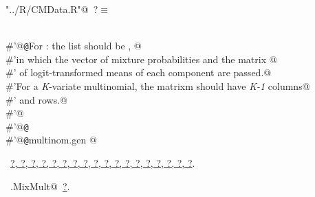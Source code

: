 \documentclass[reqno]{amsart}
\renewcommand{\NWtarget}[2]{\hypertarget{#1}{#2}}
\renewcommand{\NWlink}[2]{\hyperlink{#1}{#2}}
\begin{document}
\begin{flushleft} \small\label{scrap17}\raggedright\small
\NWtarget{nuweb?}{} \verb@"../R/CMData.R"@\nobreak\ {\footnotesize {?}}$\equiv$
\vspace{-1ex}
\begin{list}{}{} \item
\mbox{}\verb@@\\
\mbox{}\verb@#'@{\tt @}\verb@details For : the  list should be , @\\
\mbox{}\verb@#'in which the vector of mixture probabilities  and the matrix @\\
\mbox{}\verb@#' of logit-transformed means of each component are passed.@\\
\mbox{}\verb@#'For a \emph{K}-variate multinomial, the matrix{m} should have \emph{K-1} columns@\\
\mbox{}\verb@#' and  rows.@\\
\mbox{}\verb@#'@\\
\mbox{}\verb@#'@{\tt @}\verb@export@\\
\mbox{}\verb@#'@{\tt @}\verb@rdname multinom.gen @\\
\mbox{}\verb@@{\NWsep}
\end{list}
\vspace{-1.5ex}
\footnotesize
\begin{list}{}{\setlength{\itemsep}{-\parsep}\setlength{\itemindent}{-\leftmargin}}
\item \NWtxtFileDefBy\ \NWlink{nuweb?}{?}\NWlink{nuweb?}{, ?}\NWlink{nuweb?}{, ?}\NWlink{nuweb?}{, ?}\NWlink{nuweb?}{, ?}\NWlink{nuweb?}{, ?}\NWlink{nuweb?}{, ?}\NWlink{nuweb?}{, ?}\NWlink{nuweb?}{, ?}\NWlink{nuweb?}{, ?}\NWlink{nuweb?}{, ?}\NWlink{nuweb?}{, ?}\NWlink{nuweb?}{, ?}\NWlink{nuweb?}{, ?}\NWlink{nuweb?}{, ?}\NWlink{nuweb?}{, ?}\NWlink{nuweb?}{, ?}\NWlink{nuweb?}{, ?}.
\item \NWtxtIdentsUsed\nobreak\  \verb@mg.MixMult@\nobreak\ \NWlink{nuweb?}{?}.
\item{}
\end{list}
\vspace{4ex}
\end{flushleft}
\end{document}
